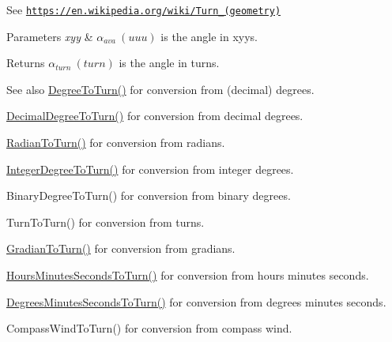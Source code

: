 See \href{https://en.wikipedia.org/wiki/Turn_(geometry)}{\tt https\+://en.\+wikipedia.\+org/wiki/\+Turn\+\_\+(geometry)} 
\begin{DoxyParams}{Parameters}
{\em xyy} & $\alpha_{ava}\ (uuu)$ is the angle in xyys. \\
\hline
\end{DoxyParams}
\begin{DoxyReturn}{Returns}
$\alpha_{turn}\ (turn)$ is the angle in turns. 
\end{DoxyReturn}
\begin{DoxySeeAlso}{See also}
\mbox{\hyperlink{group___e_g_x_math-_angle_conversions-_degree_gafb4ce930493a7d6202ede3ee1630ef5d}{Degree\+To\+Turn()}} for conversion from (decimal) degrees. 

\mbox{\hyperlink{group___e_g_x_math-_angle_conversions-_decimal_degree_ga396a13c10acdef5026c12f3217b142c1}{Decimal\+Degree\+To\+Turn()}} for conversion from decimal degrees. 

\mbox{\hyperlink{group___e_g_x_math-_angle_conversions-_radian_ga8492d6d2f6467c619b65e5fb75a9ae04}{Radian\+To\+Turn()}} for conversion from radians. 

\mbox{\hyperlink{group___e_g_x_math-_angle_conversions-_integer_degree_ga06ddbdada5a3978105c855d4aae735ae}{Integer\+Degree\+To\+Turn()}} for conversion from integer degrees. 

Binary\+Degree\+To\+Turn() for conversion from binary degrees. 

Turn\+To\+Turn() for conversion from turns. 

\mbox{\hyperlink{group___e_g_x_math-_angle_conversions-_gradian_ga11b42138910d26474f47c0a2043911c9}{Gradian\+To\+Turn()}} for conversion from gradians. 

\mbox{\hyperlink{group___e_g_x_math-_angle_conversions-_hours_minutes_seconds_ga68050282994968cd6f80a396f6a539ae}{Hours\+Minutes\+Seconds\+To\+Turn()}} for conversion from hours minutes seconds. 

\mbox{\hyperlink{group___e_g_x_math-_angle_conversions-_degrees_minutes_seconds_ga1e6b1b889f6914942b12623934341fc6}{Degrees\+Minutes\+Seconds\+To\+Turn()}} for conversion from degrees minutes seconds. 

Compass\+Wind\+To\+Turn() for conversion from compass wind. 
\end{DoxySeeAlso}
